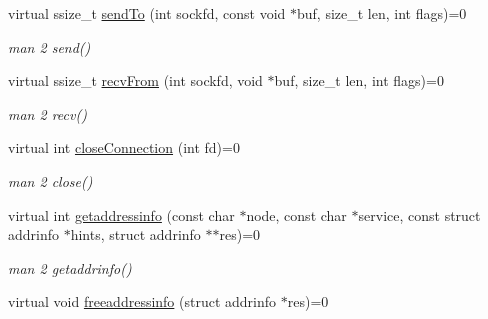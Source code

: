 \begin{DoxyCompactItemize}
\item 
\mbox{\label{classcFunctions_1_1I__cNetComm_a2cea510561ce6bb715730a80376c2313}} 
virtual ssize\+\_\+t \mbox{\hyperlink{classcFunctions_1_1I__cNetComm_a2cea510561ce6bb715730a80376c2313}{send\+To}} (int sockfd, const void $\ast$buf, size\+\_\+t len, int flags)=0
\begin{DoxyCompactList}\small\item\em man 2 send() \end{DoxyCompactList}\item 
\mbox{\label{classcFunctions_1_1I__cNetComm_ab23fbd92da6dc7deeab4e3a5327843dc}} 
virtual ssize\+\_\+t \mbox{\hyperlink{classcFunctions_1_1I__cNetComm_ab23fbd92da6dc7deeab4e3a5327843dc}{recv\+From}} (int sockfd, void $\ast$buf, size\+\_\+t len, int flags)=0
\begin{DoxyCompactList}\small\item\em man 2 recv() \end{DoxyCompactList}\item 
\mbox{\label{classcFunctions_1_1I__cNetComm_a810c3bf6177a1c538bc491d4ef87fd0e}} 
virtual int \mbox{\hyperlink{classcFunctions_1_1I__cNetComm_a810c3bf6177a1c538bc491d4ef87fd0e}{close\+Connection}} (int fd)=0
\begin{DoxyCompactList}\small\item\em man 2 close() \end{DoxyCompactList}\item 
\mbox{\label{classcFunctions_1_1I__cNetComm_a5b15d4349da4b0bc25a3c5f9cf9965f3}} 
virtual int \mbox{\hyperlink{classcFunctions_1_1I__cNetComm_a5b15d4349da4b0bc25a3c5f9cf9965f3}{getaddressinfo}} (const char $\ast$node, const char $\ast$service, const struct addrinfo $\ast$hints, struct addrinfo $\ast$$\ast$res)=0
\begin{DoxyCompactList}\small\item\em man 2 getaddrinfo() \end{DoxyCompactList}\item 
\mbox{\label{classcFunctions_1_1I__cNetComm_ae008e99e178efaa2c4f389c54e350d67}} 
virtual void \mbox{\hyperlink{classcFunctions_1_1I__cNetComm_ae008e99e178efaa2c4f389c54e350d67}{freeaddressinfo}} (struct addrinfo $\ast$res)=0
$$
\end{DoxyCompactItemize}
